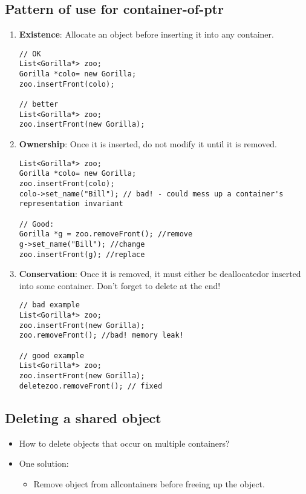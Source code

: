 \subsection{Pattern of use for container-of-ptr}
\begin{enumerate}
	\item \textbf{Existence}: Allocate an object before inserting it into any container.
\begin{lstlisting}[style=C++]
// OK
List<Gorilla*> zoo;
Gorilla *colo= new Gorilla;
zoo.insertFront(colo);

// better
List<Gorilla*> zoo;
zoo.insertFront(new Gorilla);
\end{lstlisting}
	\item \textbf{Ownership}: Once it is inserted, do not modify it until it is removed.
\begin{lstlisting}[style=C++]
List<Gorilla*> zoo;
Gorilla *colo= new Gorilla;
zoo.insertFront(colo);
colo->set_name("Bill"); // bad! - could mess up a container's representation invariant

// Good:
Gorilla *g = zoo.removeFront(); //remove
g->set_name("Bill"); //change
zoo.insertFront(g); //replace
\end{lstlisting}
	\item \textbf{Conservation}: Once it is removed, it must either be deallocatedor inserted into some container. Don’t forget to delete at the end!
\begin{lstlisting}[style=C++]
// bad example
List<Gorilla*> zoo;
zoo.insertFront(new Gorilla);
zoo.removeFront(); //bad! memory leak!

// good example
List<Gorilla*> zoo;
zoo.insertFront(new Gorilla);
deletezoo.removeFront(); // fixed
\end{lstlisting}
\end{enumerate}

\subsection{Deleting a shared object}
\begin{itemize}
	\item How to delete objects that occur on multiple containers?
	\item One solution:
	\begin{itemize}
		\item Remove object from allcontainers before freeing up the object.
	\end{itemize}
\end{itemize}